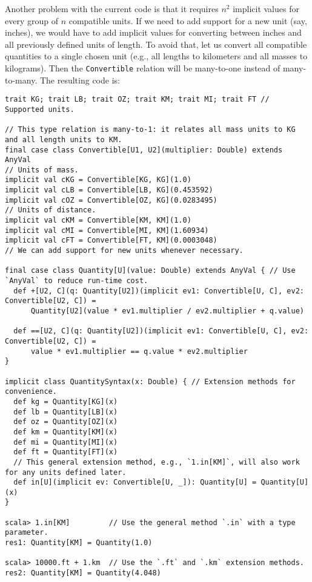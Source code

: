 Another problem with the current code is that it requires $n^{2}$
implicit values for every group of $n$ compatible units. If we need
to add support for a new unit (say, inches), we would have to add
implicit values for converting between inches and all previously defined
units of length. To avoid that, let us convert all compatible quantities
to a single chosen unit (e.g., all lengths to kilometers and all masses
to kilograms). Then the \lstinline!Convertible! relation will be
many-to-one instead of many-to-many.
The resulting code is:
\begin{lstlisting}[frame=single,fillcolor={\color{black}},framesep={0.2mm},framexleftmargin=2mm,framexrightmargin=2mm,framextopmargin=2mm,framexbottommargin=2mm]
trait KG; trait LB; trait OZ; trait KM; trait MI; trait FT // Supported units.

// This type relation is many-to-1: it relates all mass units to KG and all length units to KM.
final case class Convertible[U1, U2](multiplier: Double) extends AnyVal
// Units of mass.
implicit val cKG = Convertible[KG, KG](1.0)
implicit val cLB = Convertible[LB, KG](0.453592)
implicit val cOZ = Convertible[OZ, KG](0.0283495)
// Units of distance.
implicit val cKM = Convertible[KM, KM](1.0)
implicit val cMI = Convertible[MI, KM](1.60934)
implicit val cFT = Convertible[FT, KM](0.0003048)
// We can add support for new units whenever necessary.

final case class Quantity[U](value: Double) extends AnyVal { // Use `AnyVal` to reduce run-time cost.
  def +[U2, C](q: Quantity[U2])(implicit ev1: Convertible[U, C], ev2: Convertible[U2, C]) =
      Quantity[U2](value * ev1.multiplier / ev2.multiplier + q.value)

  def ==[U2, C](q: Quantity[U2])(implicit ev1: Convertible[U, C], ev2: Convertible[U2, C]) =
      value * ev1.multiplier == q.value * ev2.multiplier
}

implicit class QuantitySyntax(x: Double) { // Extension methods for convenience.
  def kg = Quantity[KG](x)
  def lb = Quantity[LB](x)
  def oz = Quantity[OZ](x)
  def km = Quantity[KM](x)
  def mi = Quantity[MI](x)
  def ft = Quantity[FT](x)
  // This general extension method, e.g., `1.in[KM]`, will also work for any units defined later.
  def in[U](implicit ev: Convertible[U, _]): Quantity[U] = Quantity[U](x)
}

scala> 1.in[KM]         // Use the general method `.in` with a type parameter.
res1: Quantity[KM] = Quantity(1.0)

scala> 10000.ft + 1.km  // Use the `.ft` and `.km` extension methods.
res2: Quantity[KM] = Quantity(4.048)


\end{lstlisting}
